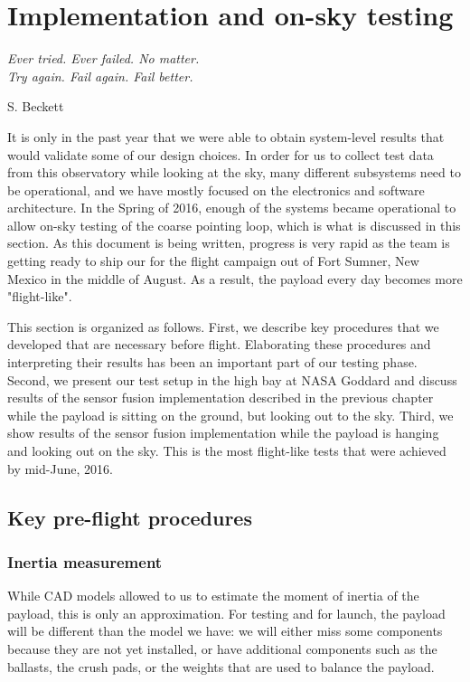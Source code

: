 \chapter[Implementation and on-sky testing]{Implementation and on-sky testing} %
\label{chap:implementation}

\epigraph{\small\itshape Ever tried. Ever failed. No matter. \\ Try again. Fail again. Fail better.}{S. Beckett}

It is only in the past year that we were able to obtain system-level results that would validate some of our design choices. In order for us to collect test data from this observatory while looking at the sky, many different subsystems need to be operational, and we have mostly focused on the electronics and software architecture. In the Spring of 2016, enough of the systems became operational to allow on-sky testing of the coarse pointing loop, which is what is discussed in this section. As this document is being written, progress is very rapid as the team is getting ready to ship our for the flight campaign out of Fort Sumner, New Mexico in the middle of August. As a result, the payload every day becomes more "flight-like".

This section is organized as follows. First, we describe key procedures that we developed that are necessary before flight. Elaborating these procedures and interpreting their results has been an important part of our testing phase. Second, we present our test setup in the high bay at NASA Goddard and discuss results of the sensor fusion implementation described in the previous chapter while the payload is sitting on the ground, but looking out to the sky. Third, we show results of the sensor fusion implementation while the payload is hanging and looking out on the sky. This is the most flight-like tests that were achieved by mid-June, 2016. 



\section{Key pre-flight procedures}
\subsection{Inertia measurement}
While CAD models allowed to us to estimate the moment of inertia of the payload, this is only an approximation. For testing and for launch, the payload will be different than the model we have: we will either miss some components because they are not yet installed, or have additional components such as the ballasts, the crush pads, or the weights that are used to balance the payload.

